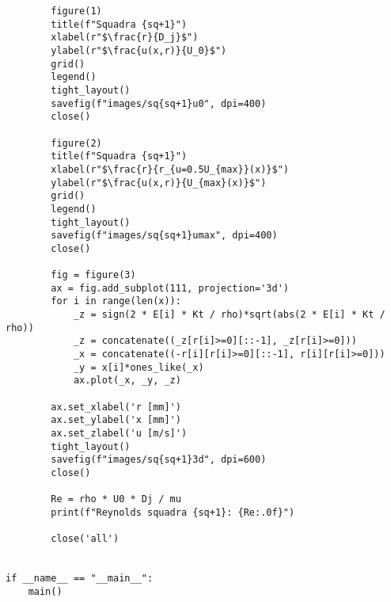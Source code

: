 \begin{lstlisting}
        figure(1)
        title(f"Squadra {sq+1}")
        xlabel(r"$\frac{r}{D_j}$")
        ylabel(r"$\frac{u(x,r)}{U_0}$")
        grid()
        legend()
        tight_layout()
        savefig(f"images/sq{sq+1}u0", dpi=400)
        close()

        figure(2)
        title(f"Squadra {sq+1}")
        xlabel(r"$\frac{r}{r_{u=0.5U_{max}}(x)}$")
        ylabel(r"$\frac{u(x,r)}{U_{max}(x)}$")
        grid()
        legend()
        tight_layout()
        savefig(f"images/sq{sq+1}umax", dpi=400)
        close()

        fig = figure(3)
        ax = fig.add_subplot(111, projection='3d')
        for i in range(len(x)):
            _z = sign(2 * E[i] * Kt / rho)*sqrt(abs(2 * E[i] * Kt / rho))
            _z = concatenate((_z[r[i]>=0][::-1], _z[r[i]>=0]))
            _x = concatenate((-r[i][r[i]>=0][::-1], r[i][r[i]>=0]))
            _y = x[i]*ones_like(_x)
            ax.plot(_x, _y, _z)

        ax.set_xlabel('r [mm]')
        ax.set_ylabel('x [mm]')
        ax.set_zlabel('u [m/s]')
        tight_layout()
        savefig(f"images/sq{sq+1}3d", dpi=600)
        close()

        Re = rho * U0 * Dj / mu
        print(f"Reynolds squadra {sq+1}: {Re:.0f}")

        close('all')


if __name__ == "__main__":
    main()
\end{lstlisting}

